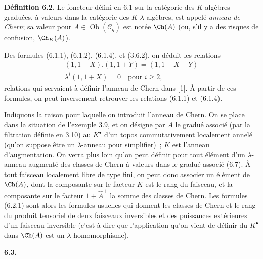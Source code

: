 \textbf{Définition 6.2.} Le foncteur défini en 6.1 sur la catégorie des \(K\)-algèbres graduées, à valeurs dans la catégorie des \(K\)-\(\lambda\)-algèbres, est appelé \emph{anneau de Chern}; sa valeur pour \(A\in\operatorname{Ob}(\mathcal C_g)\) est notée \(\Ch(A)\) (ou, s'il y a des risques de confusion, \(\Ch_K(A)\)).

Des formules (6.1.1), (6.1.2), (6.1.4), et (3.6.2), on déduit les relations
\begin{equation}\tag{6.2.1}
\begin{gathered}
 (1,1+X).(1,1+Y)=(1,1+X+Y)\\
 \lambda^i(1,1+X)=0\quad\text{pour }i\ge2,
\end{gathered}
\end{equation}
relations qui servaient à définir l'anneau de Chern dans [1]. À partir de ces formules, on peut inversement retrouver les relations (6.1.1) et (6.1.4).

Indiquons la raison pour laquelle on introduit l'anneau de Chern. On se place dans la situation de l'exemple 3.9, et on désigne par \(A\) le gradué associé (par la filtration définie en 3.10) au \(K^\bullet\) d'un topos commutativement localement annelé (qu'on suppose être un \(\lambda\)-anneau pour simplifier)~; \(K\) est l'anneau d'augmentation. On verra plus loin qu'on peut définir pour tout élément d'un \(\lambda\)-anneau augmenté des classes de Chern à valeurs dans le gradué associé (6.7). À tout faisceau localement libre de type fini, on peut donc associer un élément de \(\Ch(A)\), dont la composante sur le facteur \(K\) est le rang du faisceau, et la composante sur le facteur \(1+\widehat A^+\) la somme des classes de Chern. Les formules (6.2.1) sont alors les formules usuelles qui donnent les classes de Chern et le rang du produit tensoriel de deux faisceaux inversibles et des puissances extérieures d'un faisceau inversible (c'est-à-dire que l'application qu'on vient de définir du \(K^\bullet\) dans \(\Ch(A)\) est un \(\lambda\)-homomorphisme).

\textbf{6.3.}
